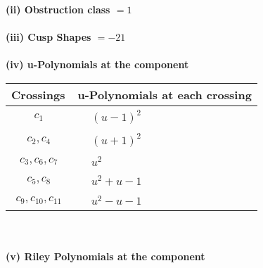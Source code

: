 \documentclass[1p]{elsarticle_modified}
\theoremstyle{definition}
\begin{document}
\flushleft \textbf{(ii) Obstruction class $= 1$}\\~\\
\flushleft \textbf{(iii) Cusp Shapes $= -21$}\\~\\
\newpage\renewcommand{\arraystretch}{1}
\flushleft \textbf{(iv) u-Polynomials at the component}\newline \\
\begin{tabular}{m{50pt}|m{274pt}}
Crossings & \hspace{64pt}u-Polynomials at each crossing \\
\hline $$\begin{aligned}c_{1}\end{aligned}$$&$\begin{aligned}
&(u-1)^2
\end{aligned}$\\
\hline $$\begin{aligned}c_{2},c_{4}\end{aligned}$$&$\begin{aligned}
&(u+1)^2
\end{aligned}$\\
\hline $$\begin{aligned}c_{3},c_{6},c_{7}\end{aligned}$$&$\begin{aligned}
&u^2
\end{aligned}$\\
\hline $$\begin{aligned}c_{5},c_{8}\end{aligned}$$&$\begin{aligned}
&u^2+u-1
\end{aligned}$\\
\hline $$\begin{aligned}c_{9},c_{10},c_{11}\end{aligned}$$&$\begin{aligned}
&u^2- u-1
\end{aligned}$\\
\hline
\end{tabular}\\~\\
\newpage\renewcommand{\arraystretch}{1}
\flushleft \textbf{(v) Riley Polynomials at the component}\newline \\
\end{document}
